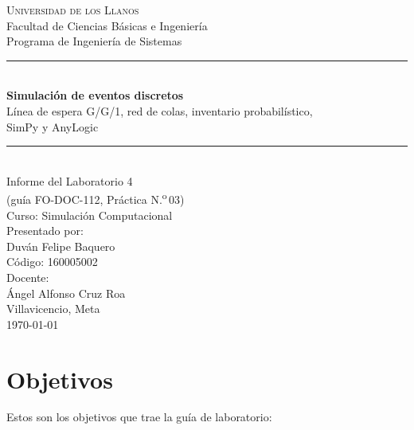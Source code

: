 \documentclass[11pt,letterpaper]{article}
\newcommand{\nombreEstudiante}{Duván Felipe Baquero}
\newcommand{\codigoEstudiante}{160005002}
\newcommand{\nombreDocente}{Ángel Alfonso Cruz Roa}
\begin{document}
\begin{titlepage}
\thispagestyle{empty}
\centering
\vspace*{\fill}

{\large \textsc{Universidad de los Llanos}}\\[0.2cm]
{\normalsize Facultad de Ciencias Básicas e Ingeniería}\\
{\normalsize Programa de Ingeniería de Sistemas}\\[1.6cm]

\rule{\textwidth}{0.8pt}\\[0.5cm]
{\LARGE \textbf{Simulación de eventos discretos}}\\[0.35cm]
{\large Línea de espera G/G/1, red de colas, inventario probabilístico,\\
SimPy y AnyLogic}\\[0.5cm]
\rule{\textwidth}{0.8pt}\\[1.6cm]

{\normalsize Informe del Laboratorio 4}\\
{\normalsize (guía FO-DOC-112, Práctica N.\textsuperscript{o}\,03)}\\
{\normalsize Curso: Simulación Computacional}\\[1.4cm]

{\normalsize Presentado por:}\\[0.15cm]
{\large \nombreEstudiante}\\
{\normalsize Código: \codigoEstudiante}\\[1.2cm]

{\normalsize Docente:}\\[0.15cm]
{\large \nombreDocente}\\[1.6cm]

{\normalsize Villavicencio, Meta \\ \today}

\vspace*{\fill}
\end{titlepage}

\newpage
\tableofcontents
\newpage

\section{Objetivos}

Estos son los objetivos que trae la guía de laboratorio:
\end{document}
